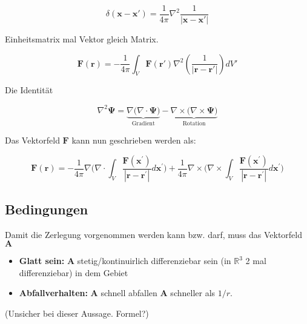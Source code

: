 \begin{equation}
\delta (\mathbf{x} - \mathbf{x'}) = \frac{1}{4 \pi} \nabla^2 \frac{1}{|\mathbf{x} - \mathbf{x'}|}
\label{helmholtz:dirac}
\end{equation}

Einheitsmatrix mal Vektor gleich Matrix. 



\begin{equation}
\mathbf{F}(\mathbf{r}) = -\frac{1}{4\pi} \int_V \mathbf{F}(\mathbf{r}') \nabla^2 \left( \frac{1}{|\mathbf{r} - \mathbf{r}'|} \right) dV'
\end{equation}

Die Identität

\begin{equation}
\nabla^2 \mathbf{\Psi}= \underbrace{\nabla \Big( \nabla \cdot \mathbf{\Psi} \Big)}_{\text{Gradient}} -\underbrace{\nabla \times \Big(\nabla \times \mathbf{\Psi} \Big)}_{\text{Rotation}}
\end{equation}

Das Vektorfeld $\mathbf{F}$ kann nun geschrieben werden als:

\begin{equation}
\mathbf{F}(\mathbf{r}) = - \frac{1}{4 \pi} \nabla \bigg( \nabla \cdot \int_V \frac{\mathbf{F}(\mathbf{x}^{\prime})}{|\mathbf{r} - \mathbf{r}^{\prime}|} d\mathbf{x}^{\prime} \bigg) + \frac{1}{4 \pi} \nabla \times \bigg( \nabla \times \int_V \frac{\mathbf{F}(\mathbf{x}^{\prime})}{|\mathbf{r} - \mathbf{r}^{\prime}|} d\mathbf{x}^{\prime} \bigg)
\end{equation}


\subsection{Bedingungen
\label{helmholtz:subsection:Bedingung}}

Damit die Zerlegung vorgenommen werden kann bzw. darf, muss das Vektorfeld $\mathbf{A}$ 

\begin{itemize}
\item \textbf{Glatt sein:} $\mathbf{A}$ stetig/kontinuirlich differenziebar sein (in $\mathbb{R}^3$ 2 mal differenziebar) in dem Gebiet
\item \textbf{Abfallverhalten:} $\mathbf{A}$ schnell abfallen  $\mathbf{A}$ schneller als $1/r$. 
\end{itemize}
(Unsicher bei dieser Aussage. Formel?)


